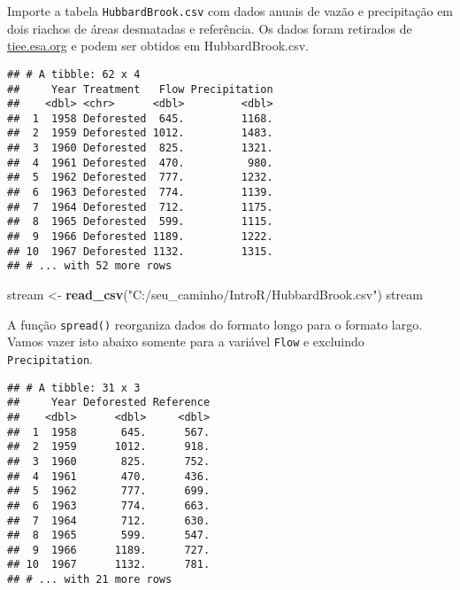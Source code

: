 \documentclass[
]{book}
\newenvironment{Shaded}{\begin{snugshade}}{\end{snugshade}}
\newcommand{\DataTypeTok}[1]{\textcolor[rgb]{0.13,0.29,0.53}{#1}}
\newcommand{\KeywordTok}[1]{\textcolor[rgb]{0.13,0.29,0.53}{\textbf{#1}}}
\newcommand{\NormalTok}[1]{#1}
\newcommand{\OperatorTok}[1]{\textcolor[rgb]{0.81,0.36,0.00}{\textbf{#1}}}
\newcommand{\StringTok}[1]{\textcolor[rgb]{0.31,0.60,0.02}{#1}}
\begin{document}
Importe a tabela \texttt{HubbardBrook.csv} com dados anuais de vazão e precipitação em dois riachos de áreas desmatadas e referência. Os dados foram retirados de \href{https://tiee.esa.org/vol/v1/data_sets/hubbard/hubbard_overview.html}{tiee.esa.org} e podem ser obtidos em HubbardBrook.csv.

\begin{verbatim}
## # A tibble: 62 x 4
##     Year Treatment   Flow Precipitation
##    <dbl> <chr>      <dbl>         <dbl>
##  1  1958 Deforested  645.         1168.
##  2  1959 Deforested 1012.         1483.
##  3  1960 Deforested  825.         1321.
##  4  1961 Deforested  470.          980.
##  5  1962 Deforested  777.         1232.
##  6  1963 Deforested  774.         1139.
##  7  1964 Deforested  712.         1175.
##  8  1965 Deforested  599.         1115.
##  9  1966 Deforested 1189.         1222.
## 10  1967 Deforested 1132.         1315.
## # ... with 52 more rows
\end{verbatim}

\begin{Shaded}
\begin{Highlighting}[]
\NormalTok{stream <-}\StringTok{ }\KeywordTok{read_csv}\NormalTok{(}\StringTok{"C:/seu_caminho/IntroR/HubbardBrook.csv"}\NormalTok{)}
\NormalTok{stream}
\end{Highlighting}
\end{Shaded}

A função \texttt{spread()} reorganiza dados do formato longo para o formato largo. Vamos vazer isto abaixo somente para a variável \texttt{Flow} e excluindo \texttt{Precipitation}.

\begin{Shaded}
\end{Shaded}

\begin{verbatim}
## # A tibble: 31 x 3
##     Year Deforested Reference
##    <dbl>      <dbl>     <dbl>
##  1  1958       645.      567.
##  2  1959      1012.      918.
##  3  1960       825.      752.
##  4  1961       470.      436.
##  5  1962       777.      699.
##  6  1963       774.      663.
##  7  1964       712.      630.
##  8  1965       599.      547.
##  9  1966      1189.      727.
## 10  1967      1132.      781.
## # ... with 21 more rows
\end{verbatim}
\end{document}
